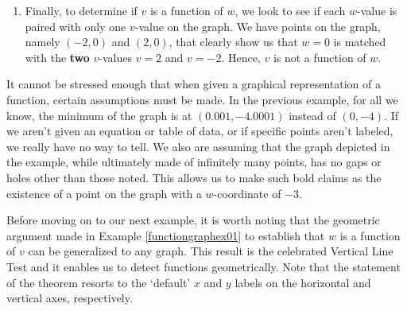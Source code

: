 \documentclass{ximera}
\begin{document}
\begin{example}
\begin{enumerate}
\begin{enumerate}
Vertically, the graph starts at $(0,-4)$ so our range starts at $w=-4$.  Note that even  though there is a hole at $(1,-3)$, the $w$-value $-3$ is covered by what \textbf{appears} to be the point $(-1,-3)$ on the graph.\footnote{For all we know, it could be $(-0.992, -3)$.} The arrow indicates that the graph extends upwards indefinitely so the range of $F$ is   $\{ w \, |  \, w \geq -4 \}$  or, in interval notation, $[-4, \infty)$.   Regarding extrema, $F$ has a minimum of $-4$ when $v = 0$, but given that the graph extends upwards indefinitely, $F$ has  no maximum. 


 



\end{enumerate}

\item  Finally, to determine if $v$ is a function of $w$, we look to see if each $w$-value is paired with only one $v$-value on the graph.  We have points on the graph, namely $(-2,0)$ and $(2,0)$, that clearly show us that $w = 0$ is matched with the \textbf{two} $v$-values $v = 2$ and $v = -2$.  Hence, $v$ is not a function of $w$.  

\end{enumerate}

\end{example}

It cannot be stressed enough that when given a graphical representation of a function, certain assumptions must be made.  In the previous example, for all we know, the minimum of the graph is at $(0.001, -4.0001)$ instead of $(0,-4)$.  If we aren't given an equation or table of data, or if specific points aren't labeled, we really have no way to tell.  We also are assuming that the graph depicted in the example, while ultimately made of infinitely many points, has no gaps or holes other than those noted.  This allows us to make such bold claims as the existence of a point on the graph with a $w$-coordinate of $-3$. 

 

Before moving on to our next example, it is worth noting that the geometric argument made in Example  \ref{functiongraphex01} to establish that $w$ is a function of $v$  can be generalized to any graph.  This result is the celebrated Vertical Line Test and it enables us to detect functions geometrically.   Note that the statement of the theorem resorts to the `default' $x$ and $y$ labels on the horizontal and vertical axes, respectively.
\end{document}
